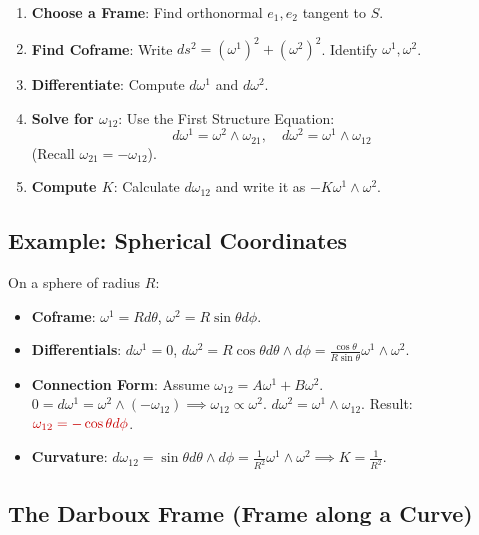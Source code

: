 \documentclass[a4paper,12pt]{article}
\newcommand{\formula}[1]{\textcolor{formulacolor}{#1}}
\begin{document}
\begin{enumerate}
    \item \textbf{Choose a Frame}: Find orthonormal $e_1, e_2$ tangent to $S$.
    \item \textbf{Find Coframe}: Write $ds^2 = (\omega^1)^2 + (\omega^2)^2$. Identify $\omega^1, \omega^2$.
    \item \textbf{Differentiate}: Compute $d\omega^1$ and $d\omega^2$.
    \item \textbf{Solve for $\omega_{12}$}: Use the First Structure Equation:
    \begin{equation*}
        d\omega^1 = \omega^2 \wedge \omega_{21}, \quad d\omega^2 = \omega^1 \wedge \omega_{12}
    \end{equation*}
    (Recall $\omega_{21} = -\omega_{12}$).
    \item \textbf{Compute $K$}: Calculate $d\omega_{12}$ and write it as $-K \omega^1 \wedge \omega^2$.
\end{enumerate}

\subsection{Example: Spherical Coordinates}
On a sphere of radius $R$:
\begin{itemize}
    \item \textbf{Coframe}: $\omega^1 = R d\theta$, $\omega^2 = R \sin\theta d\phi$.
    \item \textbf{Differentials}:
    $d\omega^1 = 0$,
    $d\omega^2 = R \cos\theta d\theta \wedge d\phi = \frac{\cos\theta}{R\sin\theta} \omega^1 \wedge \omega^2$.
    \item \textbf{Connection Form}:
    Assume $\omega_{12} = A \omega^1 + B \omega^2$.
    $0 = d\omega^1 = \omega^2 \wedge (-\omega_{12}) \implies \omega_{12} \propto \omega^2$.
    $d\omega^2 = \omega^1 \wedge \omega_{12}$.
    Result: $\formula{\omega_{12} = -\cos\theta d\phi}$.
    \item \textbf{Curvature}: $d\omega_{12} = \sin\theta d\theta \wedge d\phi = \frac{1}{R^2} \omega^1 \wedge \omega^2 \implies K = \frac{1}{R^2}$.
\end{itemize}

\subsection{The Darboux Frame (Frame along a Curve)}
\end{document}
